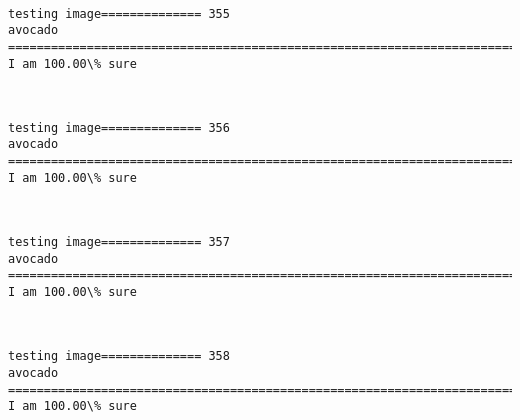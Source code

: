\documentclass[11pt]{article}
\begin{document}
    \begin{center}
    \end{center}
    { \hspace*{\fill} \\}
    
    \begin{Verbatim}[commandchars=\\\{\}]
testing image============== 355
avocado
============================================================================
I am 100.00\% sure

    \end{Verbatim}

    \begin{center}
    \end{center}
    { \hspace*{\fill} \\}
    
    \begin{Verbatim}[commandchars=\\\{\}]
testing image============== 356
avocado
============================================================================
I am 100.00\% sure

    \end{Verbatim}

    \begin{center}
    \end{center}
    { \hspace*{\fill} \\}
    
    \begin{Verbatim}[commandchars=\\\{\}]
testing image============== 357
avocado
============================================================================
I am 100.00\% sure

    \end{Verbatim}

    \begin{center}
    \end{center}
    { \hspace*{\fill} \\}
    
    \begin{Verbatim}[commandchars=\\\{\}]
testing image============== 358
avocado
============================================================================
I am 100.00\% sure

    \end{Verbatim}
\end{document}
